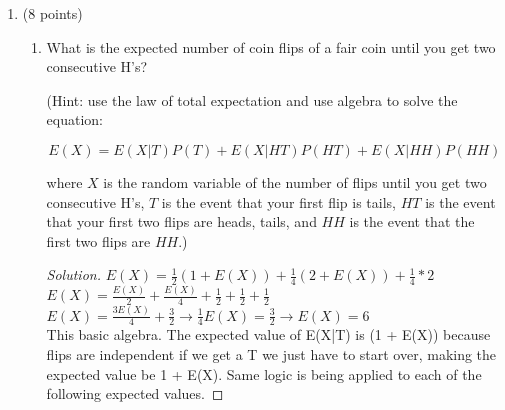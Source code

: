 \documentclass[10pt,letterpaper,unboxed,cm]{article}
\newenvironment{solution}
  {\begin{proof}[Solution]}
  {\end{proof}}
\begin{document}
\begin{enumerate}
\begin{enumerate}
\begin{enumerate}
\item
Compute the expected number of rooms with exactly 1 print.

\begin{solution}
    
    Let $X_i$ be 1 if room has exactly one print, 0 otherwise.\\
    \(P(X_i) = \frac{\binom{18}{10}}{\binom{20}{11}}\)\\
    This is true because we take away one painting and one room, and run the stars and bars formula and divide by the total amount of ways.\\
    Now by linearity of expectaction we can find the expected number of rooms with exactly 1 print:\\
    \(E(X) = 12 * \frac{\binom{18}{10}}{\binom{20}{11}} \approx \boxed{3.13 \text{ rooms}}\)

\end{solution}

\end{enumerate}

\end{enumerate}


\item (8 points)

\begin{enumerate}
\item
What is the expected number of coin flips of a fair coin until you get two consecutive H's?

(Hint: use the law of total expectation and use algebra to solve the equation:

$$E(X) = E(X|T)P(T) + E(X|HT)P(HT) + E(X|HH)P(HH)$$

where $X$ is the random variable of the number of flips until you get two consecutive H's, $T$ is the event that your first flip is tails, $HT$ is the event that your first two flips are heads, tails, and $HH$ is the event that the first two flips are $HH$.)

\begin{solution}

    \(E(X) = \frac{1}{2}(1 + E(X))  +  \frac{1}{4}(2 + E(X)) + \frac{1}{4}*2\)\\
    \(E(X) = \frac{E(X)}{2} + \frac{E(X)}{4} + \frac{1}{2} + \frac{1}{2} + \frac{1}{2}\)\\
    \(E(X) = \frac{3E(X)}{4} + \frac{3}{2} \rightarrow \frac{1}{4}E(X) = \frac{3}{2} \rightarrow \boxed{E(X) = 6}\)\\
    This basic algebra. The expected value of E(X|T) is (1 + E(X)) because flips are independent if we get a T we just have to start over, making the expected value be 1 + E(X).
    Same logic is being applied to each of the following expected values.


\end{solution}
\end{enumerate}
\end{enumerate}
\end{document}
